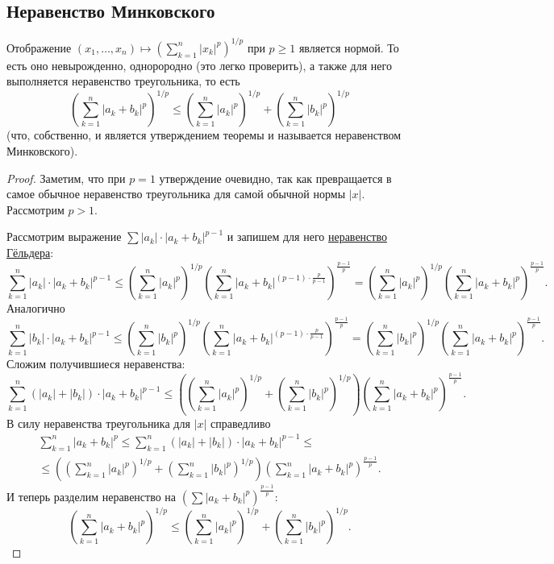 \subsection{Неравенство Минковского}

\begin{ntheorem}
	Отображение \(\displaystyle (x_1, \ldots, x_n) \mapsto \left(\sum_{k=1}^n |x_k|^p \right)^{1/p}\) при \(p \geqslant 1\) является нормой. То есть оно невырожденно, однорородно (это легко проверить), а также для него выполняется неравенство треугольника, то есть \[
	\left(\sum_{k=1}^n |a_k + b_k|^p \right)^{1/p} \leqslant \left(\sum_{k=1}^n |a_k|^p \right)^{1/p} + \left(\sum_{k=1}^n |b_k|^p \right)^{1/p}
	\]
	(что, собственно, и является утверждением теоремы и называется неравенством Минковского).
\end{ntheorem}
\begin{proof}
	Заметим, что при \(p = 1\) утверждение очевидно, так как превращается в самое обычное неравенство треугольника для самой обычной нормы \(|x|\). Рассмотрим \(p > 1\).
	
	Рассмотрим выражение \(\sum |a_k| \cdot |a_k + b_k|^{p-1}\) и запишем для него \hyperlink{Гёльдер-суммы}{неравенство Гёльдера}: \[
		\sum_{k=1}^n |a_k| \cdot |a_k + b_k|^{p-1} \leqslant \left(\sum_{k=1}^n |a_k|^p \right)^{1/p} \left(\sum_{k=1}^n |a_k + b_k|^{(p - 1) \cdot \frac{p}{p-1}} \right)^{\frac{p-1}{p}} = \left(\sum_{k=1}^n |a_k|^p \right)^{1/p} \left(\sum_{k=1}^n |a_k + b_k|^p \right)^{\frac{p-1}{p}}.
	\]
	Аналогично \[
		\sum_{k=1}^n |b_k| \cdot |a_k + b_k|^{p-1} \leqslant \left(\sum_{k=1}^n |b_k|^p \right)^{1/p} \left(\sum_{k=1}^n |a_k + b_k|^{(p - 1) \cdot \frac{p}{p-1}} \right)^{\frac{p-1}{p}} = \left(\sum_{k=1}^n |b_k|^p \right)^{1/p} \left(\sum_{k=1}^n |a_k + b_k|^p \right)^{\frac{p-1}{p}}.
	\]
	Сложим получившиеся неравенства: \[
		\sum_{k=1}^n (|a_k| + |b_k|) \cdot |a_k + b_k|^{p-1} \leqslant \left(\left(\sum_{k=1}^n |a_k|^p \right)^{1/p} + \left(\sum_{k=1}^n |b_k|^p \right)^{1/p} \right) \left(\sum_{k=1}^n |a_k + b_k|^p \right)^{\frac{p-1}{p}}.
	\]
	В силу неравенства треугольника для \(|x|\) справедливо 
	\begin{multline*}
		\sum_{k=1}^n |a_k + b_k|^p \leqslant \sum_{k=1}^n (|a_k| + |b_k|) \cdot |a_k + b_k|^{p-1} \leqslant \\
		\leqslant \left(\left(\sum_{k=1}^n |a_k|^p \right)^{1/p} + \left(\sum_{k=1}^n |b_k|^p \right)^{1/p} \right) \left(\sum_{k=1}^n |a_k + b_k|^p \right)^{\frac{p-1}{p}}.
	\end{multline*}
	И теперь разделим неравенство на \((\sum |a_k + b_k|^p)^{\frac{p-1}{p}}\): \[
	\left(\sum_{k=1}^n |a_k + b_k|^p\right)^{1/p} \leqslant \left(\sum_{k=1}^n |a_k|^p \right)^{1/p} + \left(\sum_{k=1}^n |b_k|^p \right)^{1/p}.
	\]
\end{proof}


